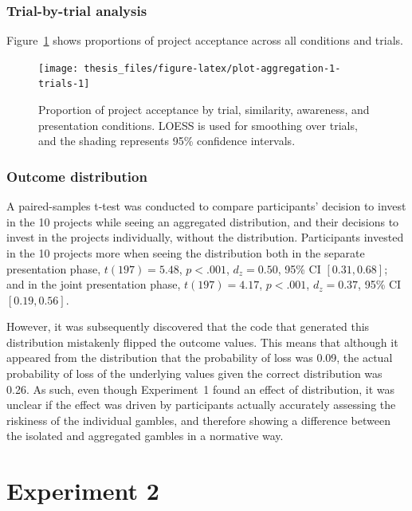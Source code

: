 \documentclass[a4paper, nobind, dvipsnames]{templates/ociamthesis}
\theoremstyle{definition}
\theoremstyle{definition}
\theoremstyle{definition}
\theoremstyle{definition}
\theoremstyle{remark}
\begin{document}
\hypertarget{trial-by-trial-aggregation-1}{%
\subsubsection{Trial-by-trial analysis}\label{trial-by-trial-aggregation-1}}

Figure~\ref{fig:plot-aggregation-1-trials} shows proportions of project
acceptance across all conditions and trials.



\begin{figure}
\texttt{[image: thesis\_files/figure-latex/plot-aggregation-1-trials-1]} \caption{Proportion of project acceptance by trial, similarity, awareness, and presentation conditions. LOESS is used for smoothing over trials, and the shading represents 95\% confidence intervals.}\label{fig:plot-aggregation-1-trials}
\end{figure}

\hypertarget{outcome-distribution-aggregation-1}{%
\subsubsection{Outcome distribution}\label{outcome-distribution-aggregation-1}}

A paired-samples t-test was conducted to compare participants' decision to
invest in the 10 projects while seeing an aggregated distribution, and their
decisions to invest in the projects individually, without the distribution.
Participants invested in the 10 projects more when seeing the distribution both
in the separate presentation phase,
\(t(197) = 5.48\), \(p < .001\), \(d_z = 0.50\), 95\% CI \([0.31, 0.68]\); and in the joint
presentation phase, \(t(197) = 4.17\), \(p < .001\), \(d_z = 0.37\), 95\% CI \([0.19, 0.56]\).

However, it was subsequently discovered that the code that generated this
distribution mistakenly flipped the outcome values. This means that although it
appeared from the distribution that the probability of loss was
0.09, the actual probability of loss of the
underlying values given the correct distribution was
0.26. As such, even though Experiment~1
found an effect of distribution, it was unclear if the effect was driven by
participants actually accurately assessing the riskiness of the individual
gambles, and therefore showing a difference between the isolated and aggregated
gambles in a normative way.

\section{Experiment 2}
\end{document}
